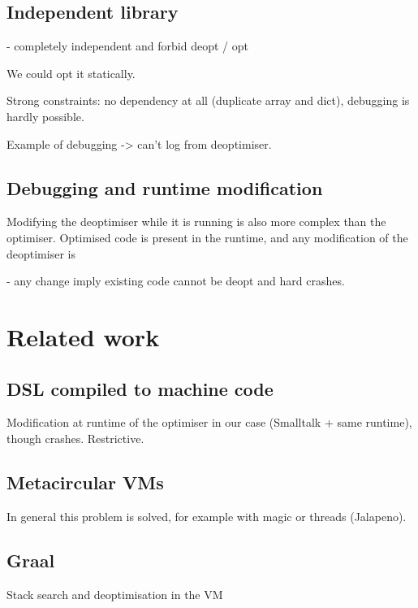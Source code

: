 \documentclass[a4paper,12pt,twoside]{../includes/ThesisStyle}
\begin{document}
\subsection{Independent library}

- completely independent and forbid deopt / opt

We could opt it statically.

Strong constraints: no dependency at all (duplicate array and dict), debugging is hardly possible.

Example of debugging -> can't log from deoptimiser. 

\subsection{Debugging and runtime modification}

Modifying the deoptimiser while it is running is also more complex than the optimiser. Optimised code is present in the runtime, and any modification of the deoptimiser is

- any change imply existing code cannot be deopt and hard crashes.

\section{Related work}

\subsection{DSL compiled to machine code}

Modification at runtime of the optimiser in our case (Smalltalk + same runtime), though crashes.
Restrictive.

\subsection{Metacircular VMs}

In general this problem is solved, for example with magic or threads (Jalapeno).

\subsection{Graal}

Stack search and deoptimisation in the VM

\ifx\wholebook\relax\else
    
\end{document}
